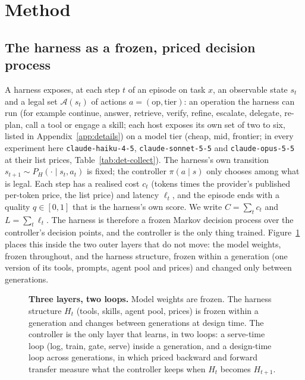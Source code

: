 \documentclass[10pt]{article}
\newcommand{\code}[1]{\texttt{#1}}
\begin{document}
\section{Method}
\label{sec:method}

\subsection{The harness as a frozen, priced decision process}
\label{sec:problem}

A harness exposes, at each step $t$ of an episode on task $x$, an observable state $s_t$ and a legal set $\mathcal{A}(s_t)$ of actions $a=(\text{op},\text{tier})$: an operation the harness can run (for example continue, answer, retrieve, verify, refine, escalate, delegate, re-plan, call a tool or engage a skill; each host exposes its own set of two to six, listed in Appendix~\ref{app:details}) on a model tier (cheap, mid, frontier; in every experiment here \code{claude-haiku-4-5}, \code{claude-sonnet-5-5} and \code{claude-opus-5-5} at their list prices, Table~\ref{tab:det-collect}). The harness's own transition $s_{t+1}\sim P_H(\cdot\mid s_t,a_t)$ is fixed; the controller $\pi(a\mid s)$ only chooses among what is legal. Each step has a realised cost $c_t$ (tokens times the provider's published per-token price, the list price) and latency $\ell_t$, and the episode ends with a quality $q\in[0,1]$ that is the harness's own score. We write $C=\sum_t c_t$ and $L=\sum_t\ell_t$. The harness is therefore a frozen Markov decision process over the controller's decision points, and the controller is the only thing trained. Figure~\ref{fig:layers} places this inside the two outer layers that do not move: the model weights, frozen throughout, and the harness structure, frozen within a generation (one version of its tools, prompts, agent pool and prices) and changed only between generations.

\begin{figure}[t]\centering

\caption{\textbf{Three layers, two loops.} Model weights are frozen. The harness structure $H_t$ (tools, skills, agent pool, prices) is frozen within a generation and changes between generations at design time. The controller is the only layer that learns, in two loops: a serve-time loop (log, train, gate, serve) inside a generation, and a design-time loop across generations, in which priced backward and forward transfer measure what the controller keeps when $H_t$ becomes $H_{t+1}$.}
\label{fig:layers}
\end{figure}
\end{document}

